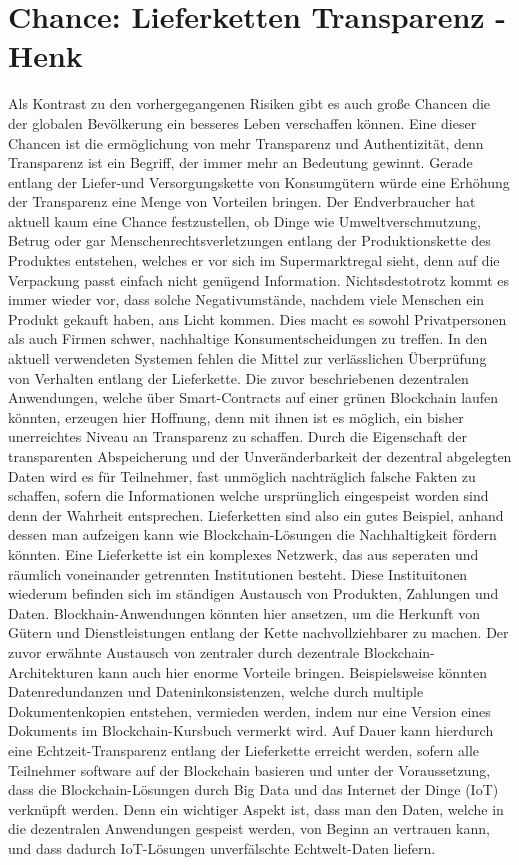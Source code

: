\section{Chance: Lieferketten Transparenz - Henk}
Als Kontrast zu den vorhergegangenen Risiken gibt es auch große Chancen die der globalen Bevölkerung ein besseres Leben verschaffen können. Eine dieser Chancen ist die ermöglichung von mehr Transparenz und Authentizität, denn
Transparenz ist ein Begriff, der immer mehr an Bedeutung gewinnt. Gerade entlang der Liefer-und Versorgungskette von Konsumgütern würde eine Erhöhung der Transparenz eine Menge von Vorteilen bringen. Der Endverbraucher hat aktuell kaum eine Chance festzustellen, ob Dinge wie Umweltverschmutzung, Betrug oder gar Menschenrechtsverletzungen entlang der Produktionskette des Produktes entstehen, welches er vor sich im Supermarktregal sieht, denn auf die Verpackung passt einfach nicht genügend Information. Nichtsdestotrotz kommt es immer wieder vor, dass solche Negativumstände, nachdem viele Menschen ein Produkt gekauft haben, ans Licht kommen. Dies macht es sowohl Privatpersonen als auch Firmen schwer, nachhaltige Konsumentscheidungen zu treffen. In den aktuell verwendeten Systemen fehlen die Mittel zur verlässlichen Überprüfung von Verhalten entlang der Lieferkette. Die zuvor beschriebenen dezentralen Anwendungen, welche über Smart-Contracts auf einer grünen Blockchain laufen könnten, erzeugen hier Hoffnung, denn mit ihnen ist es möglich, ein bisher unerreichtes Niveau an Transparenz zu schaffen. Durch die Eigenschaft der transparenten Abspeicherung und der Unveränderbarkeit der dezentral abgelegten Daten wird es für Teilnehmer, fast unmöglich nachträglich falsche Fakten zu schaffen, sofern die Informationen welche ursprünglich eingespeist worden sind denn der Wahrheit entsprechen. Lieferketten sind also ein gutes Beispiel, anhand dessen man aufzeigen kann wie Blockchain-Lösungen die Nachhaltigkeit fördern könnten. Eine Lieferkette ist ein komplexes Netzwerk, das aus seperaten und räumlich voneinander getrennten Institutionen besteht. Diese Instituitonen wiederum befinden sich im ständigen Austausch von Produkten, Zahlungen und Daten. Blockhain-Anwendungen könnten hier ansetzen, um die Herkunft von Gütern und Dienstleistungen entlang der Kette nachvollziehbarer zu machen. Der zuvor erwähnte Austausch von zentraler durch dezentrale Blockchain-Architekturen kann auch hier enorme Vorteile bringen. Beispielsweise könnten Datenredundanzen und Dateninkonsistenzen, welche durch multiple Dokumentenkopien entstehen, vermieden werden, indem nur eine Version eines Dokuments im Blockchain-Kursbuch vermerkt wird. Auf Dauer kann hierdurch eine Echtzeit-Transparenz entlang der Lieferkette erreicht werden, sofern alle Teilnehmer software auf der Blockchain basieren und unter der Voraussetzung, dass die Blockchain-Lösungen durch Big Data und das Internet der Dinge (IoT) verknüpft werden. Denn ein wichtiger Aspekt ist, dass man den Daten, welche in die dezentralen Anwendungen gespeist werden, von Beginn an vertrauen kann, und dass dadurch IoT-Lösungen unverfälschte Echtwelt-Daten liefern.\newline
